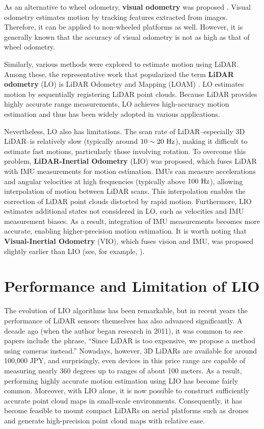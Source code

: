As an alternative to wheel odometry, {\bf visual odometry} was proposed \cite{VisuailOdometry}.
Visual odometry estimates motion by tracking features extracted from images.
Therefore, it can be applied to non-wheeled platforms as well.
However, it is generally known that the accuracy of visual odometry is not as high as that of wheel odometry.

Similarly, various methods were explored to estimate motion using LiDAR.
Among these, the representative work that popularized the term {\bf LiDAR odometry} (LO) is LiDAR Odometry and Mapping (LOAM) \cite{LOAM}.
LO estimates motion by sequentially registering LiDAR point clouds.
Because LiDAR provides highly accurate range measurements, LO achieves high-accuracy motion estimation and thus has been widely adopted in various applications.

Nevertheless, LO also has limitations.
The scan rate of LiDAR--especially 3D LiDAR--is relatively slow (typically around $10 \sim 20~{\rm Hz}$), making it difficult to estimate fast motions, particularly those involving rotation.
To overcome this problem, {\bf LiDAR-Inertial Odometry} (LIO) was proposed, which fuses LiDAR with IMU measurements for motion estimation.
IMUs can measure accelerations and angular velocities at high frequencies (typically above $100~{\rm Hz}$), allowing interpolation of motion between LiDAR scans.
This interpolation enables the correction of LiDAR point clouds distorted by rapid motion.
Furthermore, LIO estimates additional states not considered in LO, such as velocities and IMU measurement biases.
As a result, integration of IMU measurements becomes more accurate, enabling higher-precision motion estimation.
It is worth noting that {\bf Visual-Inertial Odometry} (VIO), which fuses vision and IMU, was proposed slightly earlier than LIO (see, for example, \cite{VIO}).








\section{Performance and Limitation of LIO}

The evolution of LIO algorithms has been remarkable, but in recent years the performance of LiDAR sensors themselves has also advanced significantly.
A decade ago (when the author began research in 2011), it was common to see papers include the phrase, ``Since LiDAR is too expensive, we propose a method using cameras instead.''
Nowadays, however, 3D LiDARs are available for around 100,000 JPY, and surprisingly, even devices in this price range are capable of measuring nearly 360 degrees up to ranges of about 100 meters.
As a result, performing highly accurate motion estimation using LIO has become fairly common.
Moreover, with LIO alone, it is now possible to construct sufficiently accurate point cloud maps in small-scale environments.
Consequently, it has become feasible to mount compact LiDARs on aerial platforms such as drones and generate high-precision point cloud maps with relative ease.

